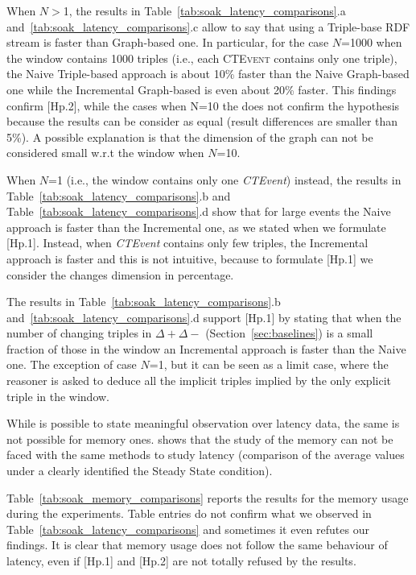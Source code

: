 

When $N>$1, the results in Table~\ref{tab:soak_latency_comparisons}.a and~\ref{tab:soak_latency_comparisons}.c allow to say that using a Triple-base RDF stream is faster than Graph-based one. In particular, for the case $N$=1000 when the window contains 1000 triples (i.e., each \textsc{CTEvent} contains only one triple),  the Naive Triple-based approach is about 10\% faster  than the Naive Graph-based one while the Incremental Graph-based is even about 20\% faster. This findings confirm [Hp.2], while the cases  when N=10 the does not confirm the hypothesis because the results can be consider as equal (result differences are smaller than 5\%). A possible explanation is that the dimension of the graph can not be considered small w.r.t the window when $N$=10.

When $N$=1 (i.e., the window contains only one \textit{CTEvent}) instead, the results in Table~\ref{tab:soak_latency_comparisons}.b and Table~\ref{tab:soak_latency_comparisons}.d show that for large events the Naive approach is faster than the Incremental one, as we stated when we formulate [Hp.1]. Instead, when \textit{CTEvent} contains only few triples, the Incremental approach is faster and this is not intuitive, because to formulate [Hp.1] we consider the changes dimension in percentage.

The results in Table~\ref{tab:soak_latency_comparisons}.b and~\ref{tab:soak_latency_comparisons}.d support [Hp.1] by stating that when the number of changing triples in $\Delta+ \Delta-$ (Section~\ref{sec:baselines}) is a small fraction of those in the window an Incremental approach is faster than the Naive one. The exception of case $N$=1, but it can be seen as a limit case, where the reasoner is asked to deduce all the implicit triples implied by the only explicit triple in the window.  

While is possible to state meaningful observation over latency data, the same is not possible for memory ones. \name shows that the study of the memory can not be faced with the same methods to study latency (comparison of the average values under a clearly identified the Steady State condition). 

Table~\ref{tab:soak_memory_comparisons} reports the results for the memory usage during the experiments. Table entries do not confirm what we observed in Table~\ref{tab:soak_latency_comparisons} and sometimes it even refutes our findings. It is clear that memory usage does not follow the same behaviour of latency, even if [Hp.1] and [Hp.2] are not totally refused by the results.


